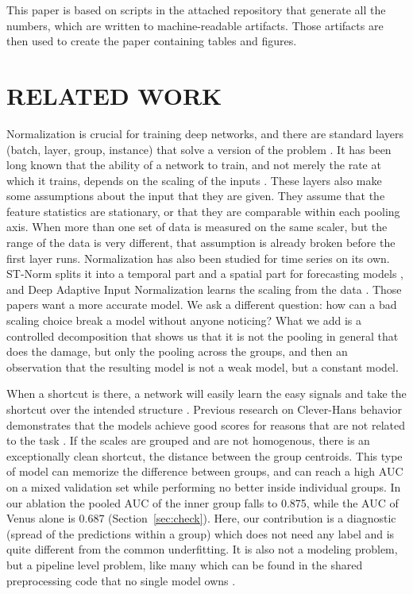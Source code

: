 \documentclass{IEEEtaes}
\begin{document}
This paper is based on scripts in the attached repository that generate all the numbers, which are written to machine-readable artifacts. Those artifacts are then used to create the paper containing tables and figures.

\section{RELATED WORK}
\label{sec:related}

Normalization is crucial for training deep networks, and there are standard layers (batch, layer, group, instance) that solve a version of the problem \cite{ioffe2015,ba2016,wu2018,ulyanov2016,huang2023}. It has been long known that the ability of a network to train, and not merely the rate at which it trains, depends on the scaling of the inputs \cite{sola1997}. These layers also make some assumptions about the input that they are given. They assume that the feature statistics are stationary, or that they are comparable within each pooling axis. When more than one set of data is measured on the same scaler, but the range of the data is very different, that assumption is already broken before the first layer runs. Normalization has also been studied for time series on its own. ST-Norm splits it into a temporal part and a spatial part for forecasting models \cite{deng2021}, and Deep Adaptive Input Normalization learns the scaling from the data \cite{passalis2020}. Those papers want a more accurate model. We ask a different question: how can a bad scaling choice break a model without anyone noticing? What we add is a controlled decomposition that shows us that it is not the pooling in general that does the damage, but only the pooling across the groups, and then an observation that the resulting model is not a weak model, but a constant model.

When a shortcut is there, a network will easily learn the easy signals and take the shortcut over the intended structure \cite{geirhos2020,shah2020}. Previous research on Clever-Hans behavior demonstrates that the models achieve good scores for reasons that are not related to the task \cite{lapuschkin2019}. If the scales are grouped and are not homogenous, there is an exceptionally clean shortcut, the distance between the group centroids. This type of model can memorize the difference between groups, and can reach a high AUC on a mixed validation set while performing no better inside individual groups. In our ablation the pooled AUC of the inner group falls to 0.875, while the AUC of Venus alone is 0.687 (Section~\ref{sec:check}). Here, our contribution is a diagnostic (spread of the predictions within a group) which does not need any label and is quite different from the common underfitting. It is also not a modeling problem, but a pipeline level problem, like many which can be found in the shared preprocessing code that no single model owns \cite{chaudhary2018}.
\end{document}
